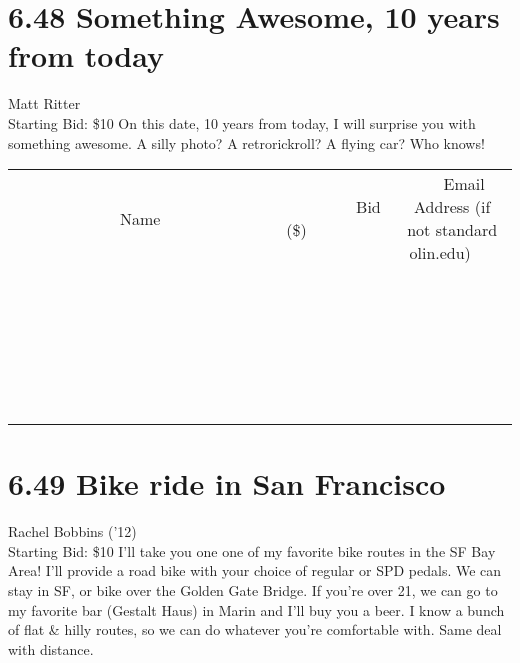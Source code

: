 \documentclass[11pt]{article}
\begin{document}
\section*{6.48 Something Awesome, 10 years from today}
Matt Ritter
\\
Starting Bid: \$10
\newline
On this date, 10 years from today, I will surprise you with something awesome. A silly photo? A retrorickroll? A flying car? Who knows!
\\[6ex]
\begin{tabular}{c c c}
~~~~~~~~~~~~~Name~~~~~~~~~~~~~ & ~~~~~~~~~Bid (\$)~~~~~~~~~  & ~~~Email Address (if not standard olin.edu)~~~\\
 & & \\
\hline
 & & \\
\hline
 & & \\
\hline
 & & \\
\hline
 & & \\
\hline
 & & \\
\hline
 & & \\
\hline
 & & \\
\hline
 & & \\
\hline
 & & \\
\hline
 & & \\
\hline
 & & \\
\hline
 & & \\
\hline
 & & \\
\hline
 & & \\
\hline
 & & \\
\hline
 & & \\
\hline
 & & \\
\hline
 & & \\
\hline
 & & \\
\hline
 & & \\
\hline
 & & \\
\hline
 & & \\
\hline
 & & \\
\hline
 & & \\
\hline
 & & \\
\hline
\end{tabular}
\newpage
\section*{6.49 Bike ride in San Francisco}
Rachel Bobbins ('12)
\\
Starting Bid: \$10
\newline
I'll take you one one of my favorite bike routes in the SF Bay Area! I'll provide a road bike with your choice of regular or SPD pedals. We can stay in SF, or bike over the Golden Gate Bridge. If you're over 21, we can go to my favorite bar (Gestalt Haus) in Marin and I'll buy you a beer. I know a bunch of flat \& hilly routes, so we can do whatever you're comfortable with. Same deal with distance.
\end{document}
